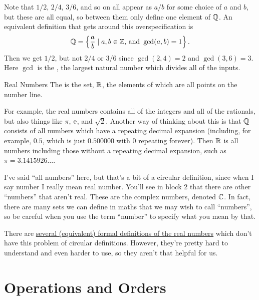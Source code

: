\documentclass[fleqn]{LectureClass/LectureClass}
\begin{document}
    Note that \(1/2\), \(2/4\), \(3/6\), and so on all appear as \(a/b\) for some choice of \(a\) and \(b\), but these are all equal, so between them only define one element of \(\mathbb{Q}\).
    An equivalent definition that gets around this overspecification is
    \begin{equation}
        \mathbb{Q} = \left\{ \frac{a}{b} \mid a, b \in \mathbb{Z} \text{, and } \gcd(a, b) = 1 \right\}.
    \end{equation}
    Then we get \(1/2\), but not \(2/4\) or \(3/6\) since \(\gcd(2, 4) = 2\) and \(\gcd(3, 6) = 3\).
    Here \(\gcd\) is the , the largest natural number which divides all of the inputs.
    
    \begin{dfn}{Real Numbers}{}
        The  is the set, \(\mathbb{R}\), the elements of which are all points on the number line.
    \end{dfn}
    
    For example, the real numbers contains all of the integers and all of the rationals, but also things like \(\pi\), \(\mathrm{e}\), and \(\sqrt{2}\).
    Another way of thinking about this is that \(\mathbb{Q}\) consists of all numbers which have a repeating decimal expansion (including, for example, \(0.5\), which is just \(0.500000\) with \(0\) repeating forever).
    Then \(\mathbb{R}\) is all numbers including those without a repeating decimal expansion, such as \(\pi = 3.1415926\ldots\).
    
    \begin{remark}{}{}
        I've said \enquote{all numbers} here, but that's a bit of a circular definition, since when I say number I really mean real number.
        You'll see in block 2 that there are other \enquote{numbers} that aren't real.
        These are the complex numbers, denoted \(\mathbb{C}\).
        In fact, there are many sets we can define in maths that we may wish to call \enquote{numbers}, so be careful when you use the term \enquote{number} to specify what you mean by that.
        
        There are \href{https://en.wikipedia.org/wiki/Construction_of_the_real_numbers}{several (equivalent) formal definitions of the real numbers} which don't have this problem of circular definitions.
        However, they're pretty hard to understand and even harder to use, so they aren't that helpful for us.
    \end{remark}
    
    \section{Operations and Orders}
\end{document}
